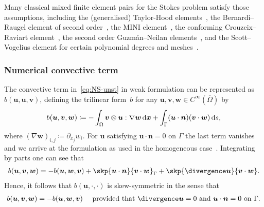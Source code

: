 \documentclass[reqno,a4paper]{amsart}
\def\vec#1{\boldsymbol{#1}}
\def\diver{\mathop{\mathrm{div}}\nolimits} %
\def\d{{\rm d}}
\def\ds{\,\d s}
\def\bn{\vec{n}}
\def\bu{\vec{u}}
\def\bv{\vec{v}}
\def\bw{\vec{w}}
\def\bx{\vec{x}}
\begin{document}
Many classical mixed finite element pairs for the Stokes problem satisfy those assumptions, including the (generalised) Taylor-Hood elements~\cite{TaylorHood1973,GiraultRaviart1986}, the Bernardi--Raugel element of second order~\cite{BR.1985}, the MINI element~\cite{ArnoldBrezziFortin1984}, the conforming Crouzeix--Raviart element~\cite{CrouzeixRaviart1973}, the second order Guzm\'an--Neilan elements~\cite{GuzmanNeilan2014,GuzmanNeilan2014a}, and the Scott--Vogelius element for certain polynomial degrees and meshes~\cite{ScottVogelius1985,GuzmanScott2019}. 

\subsubsection{Numerical convective term}\label{sec:convterm}
The convective term in~\eqref{eq:NS-unst} in weak formulation can be represented as $b(\bu,\bu,\bv)$, defining the trilinear form~$b$ for any $\bu,\bv,\bw \in C^{\infty}(\overline \Omega)$ by 
\begin{align}\label{def:conv-term}
	b(\bu,\bv,\bw) 
	\coloneqq  
	- \int_{\Omega} \bv \otimes \bu : \nabla \bw \, \mathrm{d} \bx
	+ \int_{\Gamma} (\bu \cdot \bn) (\bv \cdot \bw) \ds
	,
\end{align}
where $(\nabla \bw)_{i,j} \coloneqq \partial_{x_j} w_i$. 
For $\bu$ satisfying 
$\bu \cdot \bn = 0$ on $\Gamma$ the last term vanishes and we arrive at the formulation as used in the homogeneous case~\cite[Ch. II, \S 1, eq. (1.12)]{Temam1984}.  
Integrating by parts one can see that 
\begin{align*}
	b(\bu,\bv,\bw) = - b(\bu,\bw,\bv) 
	+ \skp{\bu \cdot \bn}{\bv \cdot \bw}_{\Gamma}
	+  \skp{\divergence \bu}{\bv \cdot \bw}.
\end{align*}
Hence, it follows that $b(\bu,\cdot,\cdot)$ is skew-symmetric in the sense that 
\begin{align*}
	b(\bu,\bv,\bw) = - b(\bu,\bw,\bv) \quad \text{ provided that } \divergence \bu = 0 \text{ and } \bu \cdot \bn = 0 \text{ on } \Gamma.
\end{align*}
\end{document}
